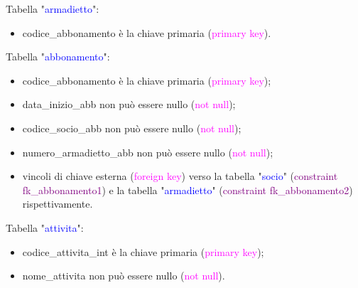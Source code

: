 \documentclass{article}
\begin{document}
    \begin{flushleft}
        Tabella "\textcolor{blue}{armadietto}": \\
        \begin{itemize}
            \item codice\_abbonamento è la chiave primaria (\textcolor{magenta}{primary key}). \\
        \end{itemize}        
    \end{flushleft}

    \begin{flushleft}
        Tabella "\textcolor{blue}{abbonamento}": \\
        \begin{itemize}
            \item codice\_abbonamento è la chiave primaria (\textcolor{magenta}{primary key}); \\
            \item data\_inizio\_abb non può essere nullo (\textcolor{magenta}{not null}); \\
            \item codice\_socio\_abb non può essere nullo (\textcolor{magenta}{not null}); \\
            \item numero\_armadietto\_abb non può essere nullo (\textcolor{magenta}{not null}); \\
            \item vincoli di chiave esterna (\textcolor{magenta}{foreign key}) verso la tabella "\textcolor{blue}{socio}" (\textcolor{purple}{constraint fk\_abbonamento1}) e la tabella "\textcolor{blue}{armadietto}" (\textcolor{purple}{constraint fk\_abbonamento2}) rispettivamente. \\
        \end{itemize}        
    \end{flushleft}

    \begin{flushleft}
        Tabella "\textcolor{blue}{attivita}": \\
        \begin{itemize}
            \item codice\_attivita\_int è la chiave primaria (\textcolor{magenta}{primary key}); \\
            \item nome\_attivita non può essere nullo (\textcolor{magenta}{not null}). \\
        \end{itemize}        
    \end{flushleft}
\end{document}
